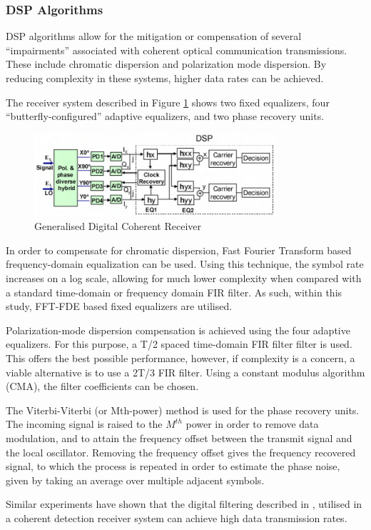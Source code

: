 \subsubsection{DSP Algorithms}

DSP algorithms allow for the mitigation or compensation of several
``impairments'' associated with coherent optical communication transmissions.
These include chromatic dispersion and polarization mode dispersion. By reducing
complexity in these systems, higher data rates can be
achieved\cite{dspcoherent}.

\par The receiver system described in Figure \ref{fig:dspcoherent} shows two fixed
equalizers, four ``butterfly-configured'' adaptive equalizers, and two phase
recovery units.

\begin{figure}[H]
	\centering
	\includegraphics[width=0.8\textwidth]{images/dspcoherent}
	\caption{Generalised Digital Coherent Receiver\cite{dspcoherent}}
	\label{fig:dspcoherent}
\end{figure}

\par In order to compensate for chromatic dispersion, Fast Fourier Transform based
frequency-domain equalization can be used. Using this technique, the symbol rate
increases on a log scale, allowing for much lower complexity when compared with
a standard time-domain or frequency domain FIR filter. As such, within this
study, FFT-FDE based fixed equalizers are utilised.

\par Polarization-mode dispersion compensation is achieved using the four
adaptive equalizers. For this purpose, a T/2 spaced time-domain FIR filter
filter is used. This offers the best possible performance, however, if
complexity is a concern, a viable alternative is to use a 2T/3 FIR filter.
Using a constant modulus algorithm (CMA), the filter coefficients can be
chosen\cite{dspcoherent}.

\par The Viterbi-Viterbi (or Mth-power) method is used for the phase recovery
units. The incoming signal is raised to the $M^{th}$ power in order to remove
data modulation, and to attain the frequency offset between the transmit signal
and the local oscillator. Removing the frequency offset gives the frequency
recovered signal, to which the process is repeated in order to estimate the
phase noise, given by taking an average over multiple adjacent
symbols\cite{dspcoherent}.

\par Similar experiments have shown that the digital filtering described in
\cite{dspcoherent}, utilised in a coherent detection receiver system can achieve
high data transmission rates\cite{Savory_08}.
